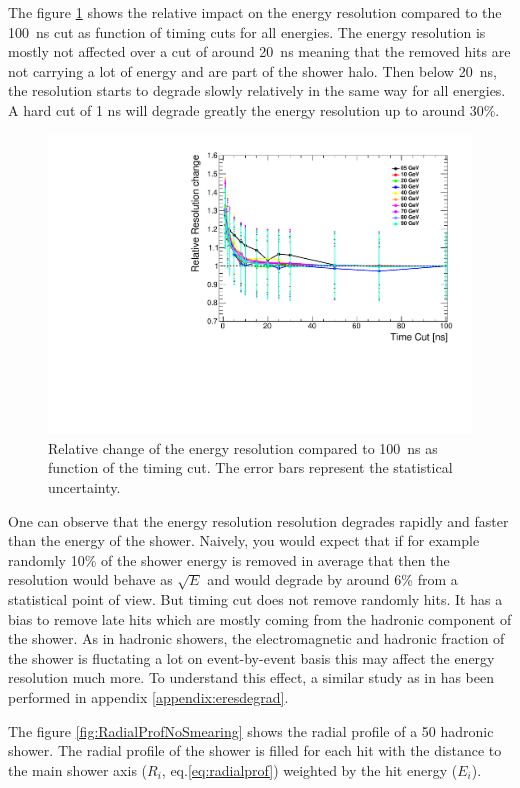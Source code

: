 The figure \ref{fig:resoRelativeNoSmearing} shows the relative impact on the energy resolution compared to the \SI{100}{\nano\second} cut as function of timing cuts for all energies. The energy resolution is mostly not affected over a cut of around \SI{20}{\nano\second} meaning that the removed hits are not carrying a lot of energy and are part of the shower halo. Then below \SI{20}{\nano\second}, the resolution starts to degrade slowly relatively in the same way for all energies. A hard cut of 1 ns will degrade greatly the energy resolution up to around 30\%.

\begin{figure}[htbp!]
  \centering
  \includegraphics[width=0.5\linewidth]{chap6/fig_TimingILD/NoSmearing/ShowerReso_TimeCuts_noSmearing}
  \caption{Relative change of the energy resolution compared to \SI{100}{\nano\second} as function of the timing cut. The error bars represent the statistical uncertainty.} \label{fig:resoRelativeNoSmearing}
\end{figure}

One can observe that the energy resolution resolution degrades rapidly and faster than the energy of the shower. Naively, you would expect that if for example randomly 10\% of the shower energy is removed in average that then the resolution would behave as $\sqrt{E}$ and would degrade by around 6\% from a statistical point of view. But timing cut does not remove randomly hits. It has a bias to remove late hits which are mostly coming from the hadronic component of the shower. As in hadronic showers, the electromagnetic and hadronic fraction of the shower is fluctating a lot on event-by-event basis this may affect the energy resolution much more. To understand this effect, a similar study as in \cite{SoftCompNew2012} has been performed in appendix \ref{appendix:eresdegrad}.

The figure \ref{fig:RadialProfNoSmearing} shows the radial profile of a 50 \GeV hadronic shower. The radial profile of the shower is filled for each hit with the distance to the main shower axis ($R_{i}$, eq.\ref{eq:radialprof})  weighted by the hit energy ($E_{i}$).

